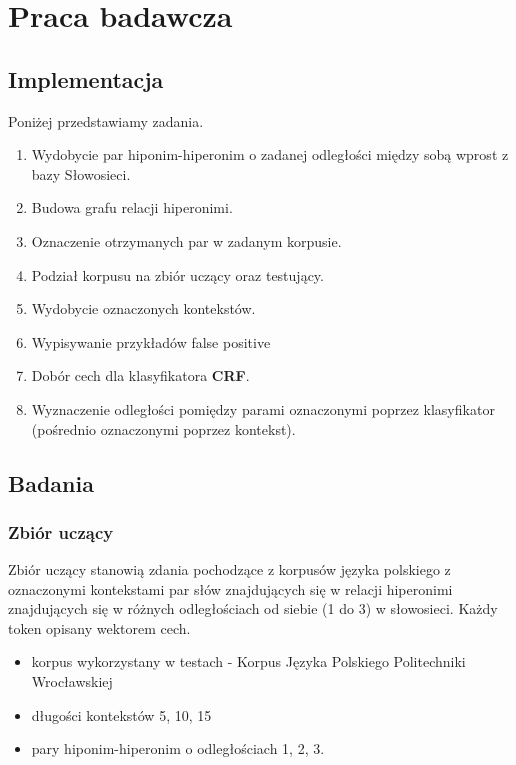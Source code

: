 \documentclass[a4paper,10pt]{report}
\begin{document}
\chapter{Praca badawcza}

\section{Implementacja}

\noindent Poniżej przedstawiamy zadania.
\begin{enumerate}
 \item Wydobycie par hiponim-hiperonim o zadanej odległości między sobą wprost z bazy Słowosieci. %
 \item Budowa grafu relacji hiperonimi. %
 \item Oznaczenie otrzymanych par w zadanym korpusie. %
 \item Podział korpusu na zbiór uczący oraz testujący. %
 \item Wydobycie oznaczonych kontekstów. %
 \item Wypisywanie przykładów false positive %
 \item Dobór cech dla klasyfikatora \textbf{CRF}.  %
 \item Wyznaczenie odległości pomiędzy parami oznaczonymi poprzez klasyfikator (pośrednio oznaczonymi poprzez kontekst).  %
\end{enumerate}

\section{Badania}

\subsection{Zbiór uczący}

Zbiór uczący stanowią zdania pochodzące z korpusów języka polskiego z oznaczonymi kontekstami par słów znajdujących się w relacji hiperonimi znajdujących się w różnych odległościach od siebie (1 do 3) w słowosieci. Każdy token opisany wektorem cech.

\begin{itemize}
 \item korpus wykorzystany w testach - Korpus Języka Polskiego Politechniki Wrocławskiej
 \item długości kontekstów 5, 10, 15
 \item pary hiponim-hiperonim o odległościach 1, 2, 3.
\end{itemize}
\end{document}
